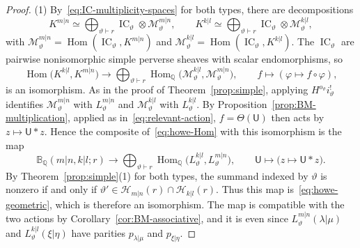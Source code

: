 \documentclass[11pt,a4paper]{amsart}
\theoremstyle{definition}
\theoremstyle{remark}
\newcommand{\Q}{\mathbb Q}
\newcommand{\bB}{\mathbb B}
\newcommand{\IC}{\operatorname{IC}}
\newcommand{\Hom}{\operatorname{Hom}}
\newcommand{\lm}{\lambda|\mu}
\newcommand{\xh}{\xi|\eta}
\numberwithin{equation}{section}
\begin{document}
\begin{proof}
(1) By~\eqref{eq:IC-multiplicity-spaces} for both types, there are
decompositions
$$
K^{m|n}\simeq\bigoplus_{\vartheta\vdash r}\IC_\vartheta\otimes
\mathcal M^{m|n}_\vartheta,\qquad
K^{k|l}\simeq\bigoplus_{\vartheta\vdash r}\IC_\vartheta\otimes
\mathcal M^{k|l}_\vartheta,
$$
with $\mathcal M^{m|n}_\vartheta=\Hom(\IC_\vartheta,K^{m|n})$ and
$\mathcal M^{k|l}_\vartheta=\Hom(\IC_\vartheta,K^{k|l})$. The
$\IC_\vartheta$ are pairwise nonisomorphic simple perverse sheaves with
scalar endomorphisms, so
$$
\Hom\bigl(K^{k|l},K^{m|n}\bigr)\longrightarrow
\bigoplus_{\vartheta\vdash r}
\Hom_\Q\bigl(\mathcal M^{k|l}_\vartheta,\mathcal M^{m|n}_\vartheta\bigr),
\qquad f\longmapsto(\varphi\mapsto f\circ\varphi),
$$
is an isomorphism. As in the proof of Theorem~\ref{prop:simple}, applying
$H^{o_\vartheta}i_\vartheta^!$ identifies $\mathcal M^{m|n}_\vartheta$ with
$L^{m|n}_\vartheta$ and $\mathcal M^{k|l}_\vartheta$ with
$L^{k|l}_\vartheta$. By Proposition~\ref{prop:BM-multiplication}, applied
as in~\eqref{eq:relevant-action}, $f=\Theta(\mathsf U)$ then acts by
$z\mapsto\mathsf U*z$. Hence the composite of~\eqref{eq:howe-Hom} with
this isomorphism is the map
$$
\bB_\Q(m|n,k|l;r)\longrightarrow
\bigoplus_{\vartheta\vdash r}
\Hom_\Q\bigl(L^{k|l}_\vartheta,L^{m|n}_\vartheta\bigr),\qquad
\mathsf U\longmapsto\bigl(z\mapsto\mathsf U*z\bigr).
$$
By Theorem~\ref{prop:simple}(1) for both types, the
summand indexed by $\vartheta$ is nonzero if and only if
$\vartheta'\in\mathcal H_{m|n}(r)\cap\mathcal H_{k|l}(r)$. Thus this map
is~\eqref{eq:howe-geometric}, which is therefore an isomorphism. The map is
compatible with the two actions by Corollary~\ref{cor:BM-associative},
and it is even since $L^{m|n}_\vartheta(\lm)$ and $L^{k|l}_\vartheta(\xh)$
have parities $p_{\lm}$ and $p_{\xh}$.


\end{proof}
\end{document}
